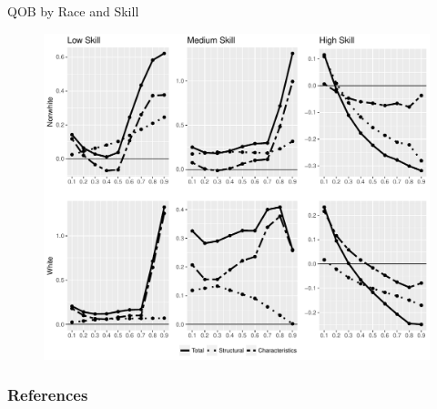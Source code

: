 \documentclass[xcolor={dvipsnames},8pt]{beamer}
\theoremstyle{definition}
\begin{document}
\begin{frame}{QOB by Race and Skill}

\begin{figure}[h]
    \centering
    \includegraphics[scale = 0.45]{graphs/003_qob_rs_debug.pdf}
\end{figure}

\end{frame}

%

\begin{frame}[allowframebreaks*] %
\frametitle{References}
\scriptsize{}
\end{frame}
\end{document}
